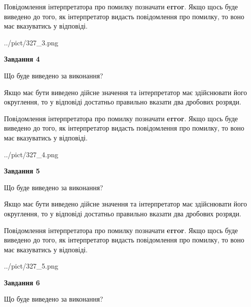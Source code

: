 \documentclass[12pt, ukrainian]{article}
\begin{document}
{\begin {Large}
Повідомлення інтерпретатора про помилку позначати \textbf{error}.
Якщо щось буде виведено до того, як інтерпретатор видасть повідомлення про помилку, 
то воно має вказуватись у відповіді. \par

\begin{center}
	{../pict/327_3.png}
\end{center}
\newpage

{\begin {center}\textbf{Завдання 4}\end {center}}\par
Що буде виведено за виконання? \par

Якщо має бути виведено дійсне значення та інтерпретатор має здійснювати його округлення, 
то у відповіді достатньо правильно вказати два дробових розряди.

Повідомлення інтерпретатора про помилку позначати \textbf{error}.
Якщо щось буде виведено до того, як інтерпретатор видасть повідомлення про помилку, 
то воно має вказуватись у відповіді. \par

\begin{center}
	{../pict/327_4.png}
\end{center}
\newpage

{\begin {center}\textbf{Завдання 5}\end {center}}\par
Що буде виведено за виконання? \par

Якщо має бути виведено дійсне значення та інтерпретатор має здійснювати його округлення, 
то у відповіді достатньо правильно вказати два дробових розряди.

Повідомлення інтерпретатора про помилку позначати \textbf{error}.
Якщо щось буде виведено до того, як інтерпретатор видасть повідомлення про помилку, 
то воно має вказуватись у відповіді. \par

\begin{center}
	{../pict/327_5.png}
\end{center}
\newpage

{\begin {center}\textbf{Завдання 6}\end {center}}\par
Що буде виведено за виконання? \par


\end{Large}}
\end{document}
